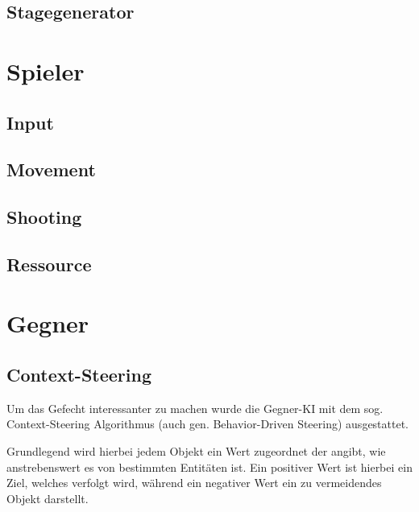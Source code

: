 \documentclass[a4paper,10pt,ngerman,fontsize=12pt]{scrreprt}
\begin{document}
\subsection{Stagegenerator}

\lipsum[3]



\section{Spieler}

\lipsum[3]



\subsection{Input}

\lipsum[3]


\subsection{Movement}

\lipsum[3]


\subsection{Shooting}

\lipsum[3]


\subsection{Ressource}

\lipsum[3]




\section{Gegner}

\lipsum[3]



\subsection{Context-Steering}

Um das Gefecht interessanter zu machen wurde die Gegner-KI mit dem sog. Context-Steering Algorithmus\cite{qCtxSteer} (auch gen. Behavior-Driven Steering) ausgestattet.

Grundlegend wird hierbei jedem Objekt ein Wert zugeordnet der angibt, wie anstrebenswert es von bestimmten Entitäten ist. Ein positiver Wert ist hierbei ein Ziel, welches verfolgt wird, während ein negativer Wert ein zu vermeidendes Objekt darstellt.
\end{document}
